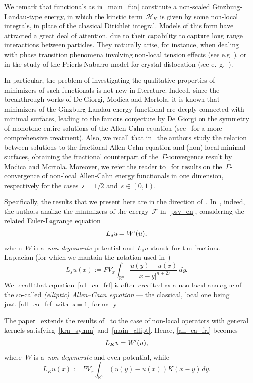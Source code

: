 \documentclass[10pt,a4paper]{amsart}
\numberwithin{equation}{section}
\newcommand{\R}{\mathbb{R}}
\newcommand{\Hc}{\mathcal{H}_K}
\renewcommand{\Gamma}{\varGamma}
\begin{document}
We remark that functionals as in~\eqref{main_fun} constitute a non-scaled Ginzburg-Landau-type energy, in which the kinetic term~$\Hc$ is given by some non-local integrals, in place of the classical Dirichlet integral. Models of this form have attracted a great deal of attention, due to their capability to capture long range interactions between particles. They naturally arise, for instance, when dealing with phase transition phenomena involving non-local tension effects (see e.g~\cite{CozziValdNONLINEARITY, SV12,SV14}), or in the study of the Peierls-Nabarro model for crystal dislocation (see e.~\!g.~\cite{BV16, DPV15, DFV14, GM12}).

In particular, the problem of investigating the qualitative properties of
minimizers of such functionals is not new in literature. Indeed, since the breakthrough works of De Giorgi, Modica and Mortola, it is known that minimizers of the Ginzburg-Landau energy functional are deeply connected with minimal surfaces, leading to the famous conjecture by De Giorgi on the symmetry of monotone entire solutions of the Allen-Cahn equation (see~\cite{Fari2009, FV13, BV16, TRUDI} for a more comprehensive treatment). 
Also, we recall that in~\cite{SV12}
the authors study the relation between solutions to the fractional Allen-Cahn equation and (non) local minimal surfaces, obtaining the fractional counterpart of the~$\Gamma$-convergence result by Modica and Mortola.
Moreover, we refer the reader to~\cite{AB94, PV20} for results on the~$\Gamma$-convergence of non-local Allen-Cahn energy functionals in one dimension, respectively for the cases~$s =1/2$ and~$s \in (0,1)$.


Specifically, the results that we present here are in the direction
of~\cite{PSV13, CP16}.
In~\cite{PSV13}, indeed, the authors analize the minimizers of the energy~$\mathcal{F}$ in~\eqref{psv_en}, considering the related Euler-Lagrange equation   
\begin{equation}\label{all_ca_frl}
L_s u = W\rq{}(u),
\end{equation}
where~$W$ is a~\textit{non-degenerate} potential and~$L_s u$ stands for the fractional Laplacian (for which we mantain the notation used in~\cite{DPV15})
$$
L_s u(x) := PV_x \int_{\R^n}\frac{u(y)-u(x)}{ |x-y|^{n+2s}} \, dy.
$$
We recall that equation~\eqref{all_ca_frl} is often credited as a non-local analogue of the so-called \textit{(elliptic) Allen–Cahn equation} --- the classical, local one being just~\eqref{all_ca_frl} with~$s=1$, formally.

The paper~\cite{CP16} extends the results of~\cite{PSV13} to the case of non-local operators with general kernels satisfying~\eqref{krn_symm} and~\eqref{main_ellipt}. Hence, \eqref{all_ca_frl} becomes
\begin{equation}\label{eurl_lag_eq}
L_K u = W\rq{}(u),
\end{equation}
where~$W$ is a~\textit{non-degenerate} and even potential, while
\begin{equation}\label{main_op}
L_K u(x) := PV_x \int_{\R^n}(u(y)-u(x)) K(x-y) \, dy.
\end{equation}
\end{document}
